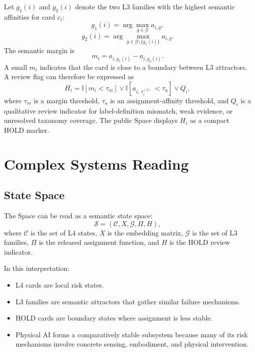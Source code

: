 \documentclass[11pt,a4paper]{article}
\begin{document}
Let $g_1(i)$ and $g_2(i)$ denote the two L3 families with the highest semantic affinities for card $c_i$:
\begin{equation}
g_1(i)=\arg\max_{g\in\mathcal{G}} a_{i,g},
\end{equation}
\begin{equation}
g_2(i)=\arg\max_{g\in\mathcal{G}\setminus\{g_1(i)\}} a_{i,g}.
\end{equation}
The semantic margin is
\begin{equation}
m_i=a_{i,g_1(i)}-a_{i,g_2(i)}.
\end{equation}
A small $m_i$ indicates that the card is close to a boundary between L3 attractors. A review flag can therefore be expressed as
\begin{equation}
H_i =
\mathbb{I}\left[
m_i < \tau_m
\right]
\lor
\mathbb{I}\left[
a_{i,\ell^{(3)}_i}<\tau_a
\right]
\lor
Q_i,
\end{equation}
where $\tau_m$ is a margin threshold, $\tau_a$ is an assignment-affinity threshold, and $Q_i$ is a qualitative review indicator for label-definition mismatch, weak evidence, or unresolved taxonomy coverage. The public Space displays $H_i$ as a compact HOLD marker.

\section{Complex Systems Reading}

\subsection{State Space}

The Space can be read as a semantic state space:
\begin{equation}
\mathcal{S} = \left(\mathcal{C}, X, \mathcal{G}, \Pi, H\right),
\end{equation}
where $\mathcal{C}$ is the set of L4 states, $X$ is the embedding matrix, $\mathcal{G}$ is the set of L3 families, $\Pi$ is the released assignment function, and $H$ is the HOLD review indicator.

In this interpretation:
\begin{itemize}
  \item L4 cards are local risk states.
  \item L3 families are semantic attractors that gather similar failure mechanisms.
  \item HOLD cards are boundary states where assignment is less stable.
  \item Physical AI forms a comparatively stable subsystem because many of its risk mechanisms involve concrete sensing, embodiment, and physical intervention.
\end{itemize}
\end{document}
